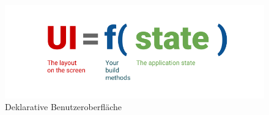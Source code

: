 \begin{figure}[tbt]
	\begin{center}
		\includegraphics[scale=0.4]{Theoretische_Grundlagen/images/flutter_state.png}
	\end{center}
	\caption[Deklarative Benutzeroberfläche]{Deklarative Benutzeroberfläche \protect \footnotemark}
	\label{fig:flutter_state}
\end{figure}







